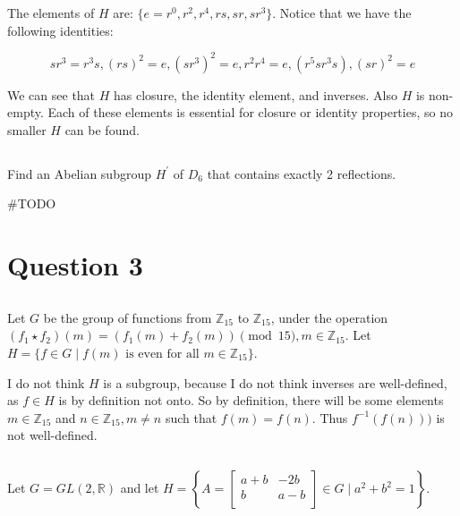 \documentclass[a4paper,12pt]{article}
\begin{document}
The elements of $H$ are: $\{ e = r^0, r^2, r^4, rs, sr, sr^3 \}$. Notice that we have the following identities:

\begin{equation*}
sr^3 = r^3s, (rs)^2 = e, (sr^3)^2 = e, r^2r^4 = e, (r^5sr^3s), (sr)^2 = e
\end{equation*}

We can see that $H$ has closure, the identity element, and inverses. Also $H$ is non-empty. Each of these elements is essential for closure or identity properties, so no smaller $H$ can be found.

\subsection{}

Find an Abelian subgroup $H^{\prime}$ of $D_6$ that contains exactly 2 reflections.

\#TODO


\section{Question 3}

\subsection{}

Let $G$ be the group of functions from $\mathbb{Z}_{15}$ to $\mathbb{Z}_{15}$, under the operation $(f_1 \star f_2)(m) = (f_1(m) + f_2(m)) \pmod{15}, m \in \mathbb{Z}_{15}$. Let $H = \{f \in G \mid f(m) \text{ is even for all } m \in \mathbb{Z}_{15}\}$.

I do not think $H$ is a subgroup, because I do not think inverses are well-defined, as $f \in H$ is by definition not onto. So by definition, there will be some elements $m \in \mathbb{Z}_15$ and $n \in \mathbb{Z}_15, m \neq n$ such that $f(m) = f(n)$. Thus $f^{-1}(f(n)))$ is not well-defined.

\subsection{}

Let $G=GL(2, \mathbb{R})$ and let $H=\left\{A=\left[ \begin{array}{ccc} a+b & -2b \\ b & a-b \\ \end{array} \right] \in G \mid a^2 + b^2 =1 \right\}$.
\end{document}
